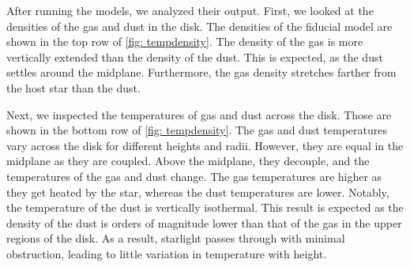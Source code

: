 \documentclass[twoside, single, authoryear, semicolon, 12pt]{lion-msc}
\newcommand{\4}{$_4$}
\newcommand{\3}{$_3$}
\newcommand{\2}{$_2$}
\begin{document}
After running the models, we analyzed their output. First, we looked at the densities of the gas and dust in the disk. The densities of the fiducial model are shown in the top row of \autoref{fig: tempdensity}. The density of the gas is more vertically extended than the density of the dust. This is expected, as the dust settles around the midplane. Furthermore, the gas density stretches farther from the host star than the dust. 

Next, we inspected the temperatures of gas and dust across the disk. Those are shown in the bottom row of \autoref{fig: tempdensity}.  The gas and dust temperatures vary across the disk for different heights and radii. However, they are equal in the midplane as they are coupled. Above the midplane, they decouple, and the temperatures of the gas and dust change. The gas temperatures are higher as they get heated by the star, whereas the dust temperatures are lower. Notably, the temperature of the dust is vertically isothermal. This result is expected as the density of the dust is orders of magnitude lower than that of the gas in the upper regions of the disk.  As a result, starlight passes through with minimal obstruction, leading to little variation in temperature with height.
\end{document}
